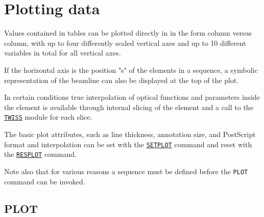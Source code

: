 
\chapter{Plotting data}
\label{chap:plot}

Values contained in \madx tables can be plotted directly in \madx in the
form column versus column, with up to four differently scaled vertical
axes and up to 10 different variables in total for all vertical axes.

If the horizontal axis is the position "s" of the elements
in a sequence, a symbolic representation of the beamline can also
be displayed at the top of the plot. 

In certain conditions true interpolation of optical functions and
parameters inside the element is available through internal slicing of
the element and a call to the \hyperref[chap:twiss]{\texttt{TWISS}}
module for each slice. 

The basic plot attributes, such as line thickness, annotation size,
and PostScript format and interpolation can be set with the
\hyperref[sec:setplot]{\texttt{SETPLOT}} command and reset with the
\hyperref[sec:resplot]{\texttt{RESPLOT}} command.

Note also that for various reasons a sequence must be defined before the 
\texttt{PLOT} command can be invoked. 

\section{PLOT}	
\label{sec:plot}

